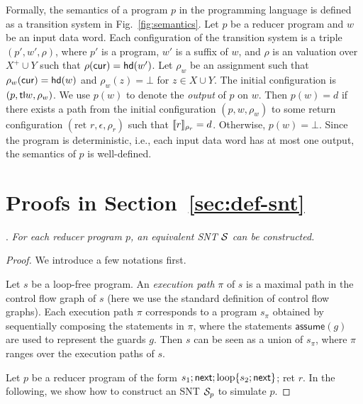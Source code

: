 \begin{appendix}
Formally, the semantics of a program $p$ in the programming language is defined as a transition system in Fig.~\ref{fig:semantics}. Let $p$ be a reducer program and $w$ be an input data word.  Each configuration of the transition system is a triple $(p', w', \rho)$, where $p'$ is a program, $w'$ is a suffix of $w$, and $\rho$ is an valuation over $X^+\cup Y$ such that $\rho(\mathsf{cur})=\mathsf{hd}(w')$. 
Let $\rho_w$ be an assignment such that $\rho_w(\mathsf{cur})=\mathsf{hd}(w)$ and $\rho_w(z)=\bot$ for $z \in X \cup Y$.
The initial configuration is $(p, \mathsf{tl}{w}, \rho_w)$.
We use $p(w)$ to denote the \emph{output} of $p$ on $w$. Then $p(w) =d$ if there exists a path from the initial configuration $(p, w, \rho_w)$ to some return configuration $(\mbox{ret }r,  \epsilon, \rho_r)$ such that $
\llbracket r\rrbracket_{\rho_r}=d$. Otherwise, $p(w)=\bot$. Since the program is deterministic, i.e., each input data word has at most one output, the semantics of $p$ is well-defined.

\section{Proofs in Section~\ref{sec:def-snt}}




\newcommand\assume{\mathsf{assume}}

\newcommand\loc{\mathfrak{l}}

.
{\it 
For each reducer program $p$, an equivalent SNT ${\mathcal{S} }$ can be constructed.
}

\smallskip

\begin{proof}
We introduce a few notations first.

Let $s$ be a loop-free program. An \emph{execution path} $\pi$ of $s$ is a maximal path in the control flow graph of $s$ (here we use the standard definition of control flow graphs). Each execution path $\pi$ corresponds to a program $s_\pi$ obtained by sequentially composing the statements in $\pi$, where the statements $\assume(g)$ are used to represent the guards $g$. Then $s$ can be seen as a union of $s_\pi$, where $\pi$ ranges over the execution paths of $s$. 

Let $p$ be a reducer program of the form $s_1; \mathsf{next}; \mbox{loop\{} s_2;\mathsf{next}\mbox{\}}$; ret $r$.  In the following, we show how to construct an SNT ${\mathcal{S} }_p$ to simulate $p$.


\end{proof}
\end{appendix}
